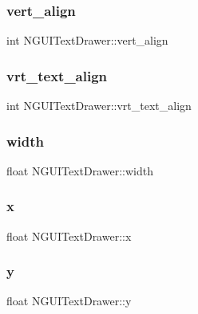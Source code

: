 \hypertarget{class_n_g_u_i_text_drawer_ad936996af18eea907348fdc22f296cf2}{}\label{class_n_g_u_i_text_drawer_ad936996af18eea907348fdc22f296cf2} 
\subsubsection{\texorpdfstring{vert\+\_\+align}{vert\_align}}
{\footnotesize\ttfamily int N\+G\+U\+I\+Text\+Drawer\+::vert\+\_\+align}

\hypertarget{class_n_g_u_i_text_drawer_a58a9a9b356ca1c4d2848f88431492639}{}\label{class_n_g_u_i_text_drawer_a58a9a9b356ca1c4d2848f88431492639} 
\subsubsection{\texorpdfstring{vrt\+\_\+text\+\_\+align}{vrt\_text\_align}}
{\footnotesize\ttfamily int N\+G\+U\+I\+Text\+Drawer\+::vrt\+\_\+text\+\_\+align}

\hypertarget{class_n_g_u_i_text_drawer_a80c1d4fd7c92d417c610e4e4424ac6d2}{}\label{class_n_g_u_i_text_drawer_a80c1d4fd7c92d417c610e4e4424ac6d2} 
\subsubsection{\texorpdfstring{width}{width}}
{\footnotesize\ttfamily float N\+G\+U\+I\+Text\+Drawer\+::width}

\hypertarget{class_n_g_u_i_text_drawer_afb2395d7c0cda3aa9843a7ee1d4393cd}{}\label{class_n_g_u_i_text_drawer_afb2395d7c0cda3aa9843a7ee1d4393cd} 
\subsubsection{\texorpdfstring{x}{x}}
{\footnotesize\ttfamily float N\+G\+U\+I\+Text\+Drawer\+::x}

\hypertarget{class_n_g_u_i_text_drawer_a72a23eb11e446ffddebadd3c10b15a23}{}\label{class_n_g_u_i_text_drawer_a72a23eb11e446ffddebadd3c10b15a23} 
\subsubsection{\texorpdfstring{y}{y}}
{\footnotesize\ttfamily float N\+G\+U\+I\+Text\+Drawer\+::y}

